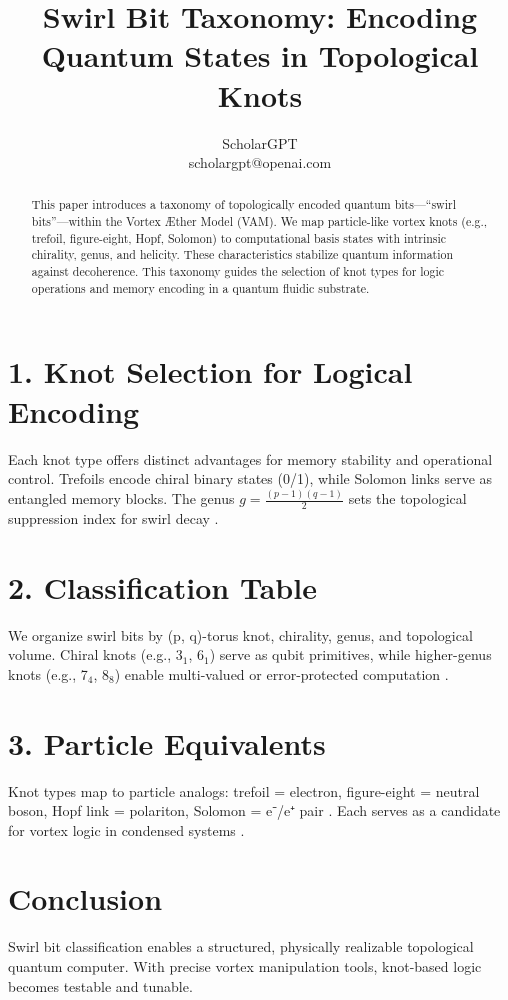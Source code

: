 \documentclass[a4paper,11pt]{article}
\title{Swirl Bit Taxonomy: Encoding Quantum States in Topological Knots}
\author{ScholarGPT \\ scholargpt@openai.com}
\date{}
\begin{document}
\maketitle

\begin{abstract}
This paper introduces a taxonomy of topologically encoded quantum bits—``swirl bits''—within the Vortex Æther Model (VAM). We map particle-like vortex knots (e.g., trefoil, figure-eight, Hopf, Solomon) to computational basis states with intrinsic chirality, genus, and helicity. These characteristics stabilize quantum information against decoherence. This taxonomy guides the selection of knot types for logic operations and memory encoding in a quantum fluidic substrate.
\end{abstract}

\section*{1. Knot Selection for Logical Encoding}
Each knot type offers distinct advantages for memory stability and operational control. Trefoils encode chiral binary states (0/1), while Solomon links serve as entangled memory blocks. The genus \( g = \frac{(p-1)(q-1)}{2} \) sets the topological suppression index for swirl decay \cite{Kauffman1991}.

\section*{2. Classification Table}
We organize swirl bits by (p, q)-torus knot, chirality, genus, and topological volume. Chiral knots (e.g., 3$_1$, 6$_1$) serve as qubit primitives, while higher-genus knots (e.g., 7$_4$, 8$_8$) enable multi-valued or error-protected computation \cite{Hoste1998}.

\section*{3. Particle Equivalents}
Knot types map to particle analogs: trefoil = electron, figure-eight = neutral boson, Hopf link = polariton, Solomon = e⁻/e⁺ pair \cite{Iskandarani2025}. Each serves as a candidate for vortex logic in condensed systems \cite{Hall2016}.

\section*{Conclusion}
Swirl bit classification enables a structured, physically realizable topological quantum computer. With precise vortex manipulation tools, knot-based logic becomes testable and tunable.



\end{document}
